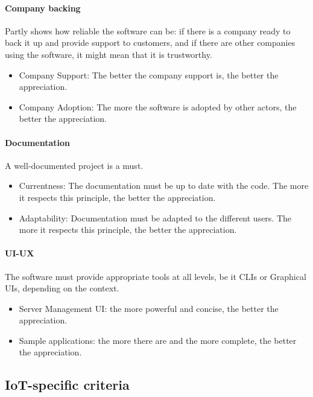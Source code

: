 \documentclass{article}
\begin{document}
\paragraph{Company backing} Partly shows how reliable the software can be: if there is a company ready to back it up and provide support to customers, and if there are other companies using the software, it might mean that it is trustworthy.

\begin{itemize}
\item Company Support: The better the company support is, the better the appreciation.
\item Company Adoption: The more the software is adopted by other actors, the better the appreciation.
\end{itemize}

\paragraph{Documentation} A well-documented project is a must.

\begin{itemize}
\item Currentness: The documentation must be up to date with the code. The more it respects this principle, the better the appreciation.
\item Adaptability: Documentation must be adapted to the different users. The more it respects this principle, the better the appreciation.
\end{itemize}

\paragraph{UI-UX} The software must provide appropriate tools at all levels, be it CLIs or Graphical UIs, depending on the context.

\begin{itemize}
\item Server Management UI: the more powerful and concise, the better the appreciation.
\item Sample applications: the more there are and the more complete, the better the appreciation.
\end{itemize}

\subsection{IoT-specific criteria}
\end{document}
